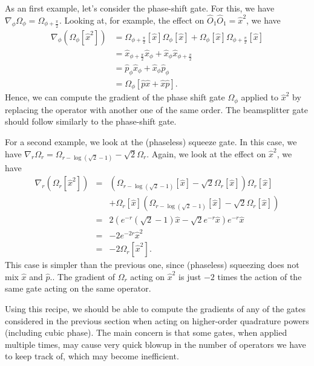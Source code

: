 \documentclass[aps,pra,10pt,twocolumn,groupedaddress,nofootinbib]{revtex4-1}
\theoremstyle{plain}
\begin{document}
As an first example, let's consider the phase-shift gate. For this, we have $\nabla_\phi\Omega_\phi = \Omega_{\phi+\frac{\pi}{2}}$. Looking at, for example, the effect on $\hat{O}_1\hat{O}_1=\hat{x}^2$, we have
\begin{align}
 \nabla_\phi\left( \Omega_\phi[\hat{x}^2] \right) 
 & = \Omega_{\phi+\frac{\pi}{2}}[\hat{x}]\Omega_{\phi}[\hat{x}]
   + \Omega_{\phi}[\hat{x}]\Omega_{\phi+\frac{\pi}{2}}[\hat{x}] \nonumber \\
 & = \hat{x}_{\phi+\frac{\pi}{2}} \hat{x}_\phi + \hat{x}_\phi \hat{x}_{\phi+\frac{\pi}{2}} \nonumber \\
 & = \hat{p}_\phi\hat{x}_\phi + \hat{x}_\phi\hat{p}_\phi \nonumber \\
 & = \Omega_\phi[\hat{p}\hat{x} + \hat{x}\hat{p}].
\end{align}
Hence, we can compute the gradient of the phase shift gate $\Omega_\phi$ applied to $\hat{x}^2$ by replacing the operator with another one of the same order. The beamsplitter gate should follow similarly to the phase-shift gate.

For a second example, we look at the (phaseless) squeeze gate. In this case, we have $\nabla_r\Omega_r = \Omega_{r-\log(\sqrt{2} - 1)} - \sqrt{2}\Omega_{r}$. Again, we look at the effect on $\hat{x}^2$, we have
\begin{align}
  \nabla_r\left( \Omega_r[\hat{x}^2] \right) 
 & = & \left( \Omega_{r-\log(\sqrt{2} - 1)}[\hat{x}] - \sqrt{2}\Omega_{r}[\hat{x}] \right)\Omega_{r}[\hat{x}] \nonumber \\
 &   & + \Omega_{r}[\hat{x}] \left( \Omega_{r-\log(\sqrt{2} - 1)}[\hat{x}] - \sqrt{2}\Omega_{r}[\hat{x}] \right) \nonumber \\
 & = & 2\left( e^{-r}(\sqrt{2} - 1)\hat{x} - \sqrt{2}e^{-r}\hat{x} \right)e^{-r}\hat{x} \nonumber \\
 & = & -2e^{-2r}\hat{x}^2 \nonumber \\
 & = & -2\Omega_{r}[\hat{x}^2].
\end{align}
This case is simpler than the previous one, since (phaseless) squeezing does not mix $\hat{x}$ and $\hat{p}$.. The gradient of $\Omega_r$ acting on $\hat{x}^2$ is just $-2$ times the action of the same gate acting on the same operator.

Using this recipe, we should be able to compute the gradients of any of the gates considered in the previous section when acting on higher-order quadrature powers (including cubic phase). The main concern is that some gates, when applied multiple times, may cause very quick blowup in the number of operators we have to keep track of, which may become inefficient.




 
\end{document}
